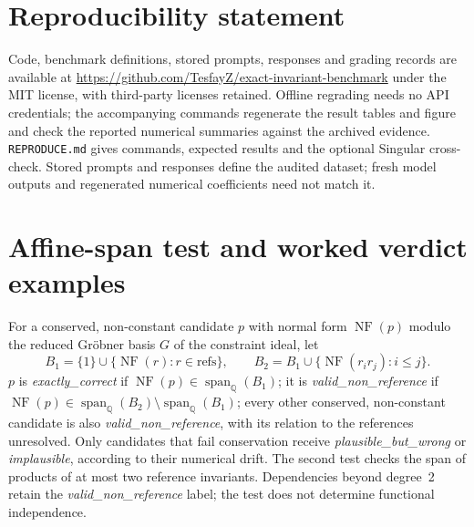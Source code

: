 \documentclass[10pt]{article}
\newcommand{\NF}{\operatorname{NF}}
\newcommand{\Q}{\mathbb{Q}}
\begin{document}
\section*{Reproducibility statement}\label{sec:repro}

Code, benchmark definitions, stored prompts, responses and grading records are available at
\url{https://github.com/TesfayZ/exact-invariant-benchmark} under the MIT license,
with third-party licenses retained. Offline regrading needs no API credentials;
the accompanying commands regenerate the result tables and figure and check
the reported numerical summaries against the archived evidence. \texttt{REPRODUCE.md}
gives commands, expected results and the optional Singular cross-check.
Stored prompts and responses define the audited dataset; fresh model outputs
and regenerated numerical coefficients need not match it.




\appendix

\section{Affine-span test and worked verdict examples}\label{app:verdicts}

For a conserved, non-constant candidate $p$ with normal form $\NF(p)$ modulo the reduced Gr\"obner basis $G$ of the constraint ideal, let
\[
B_1 = \{1\} \cup \{\NF(r) : r \in \text{refs}\}, \qquad
B_2 = B_1 \cup \{\NF(r_i r_j) : i \le j\}.
\]
$p$ is \emph{exactly\_correct} if $\NF(p) \in \operatorname{span}_{\Q}(B_1)$; it is \emph{valid\_non\_reference} if $\NF(p) \in \operatorname{span}_{\Q}(B_2) \setminus \operatorname{span}_{\Q}(B_1)$; every other conserved, non-constant candidate is also \emph{valid\_non\_reference}, with its relation to the references unresolved. Only candidates that fail conservation receive \emph{plausible\_but\_wrong} or \emph{implausible}, according to their numerical drift. The second test checks the span of products of at most two reference invariants. Dependencies beyond degree~2 retain the \emph{valid\_non\_reference} label; the test does not determine functional independence.
\end{document}
